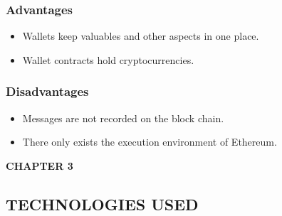 \documentclass[12pt]{article}
\begin{document}
\newpage
\subsubsection{Advantages}
\begin{itemize}
\item Wallets keep valuables and other aspects in one place.
\item Wallet contracts hold cryptocurrencies.

\end{itemize}
\vspace{10px}
\subsubsection{Disadvantages}
\begin{itemize}
\item Messages are not recorded on the block chain.
\item There only exists the execution environment of Ethereum.

\end{itemize}
\vspace{10px}













\newpage























\begin{flushleft}\textbf{CHAPTER 3} \end{flushleft}
\begin{flushleft}\section{TECHNOLOGIES USED } \end{flushleft}

\vspace*{10px}
\end{document}

